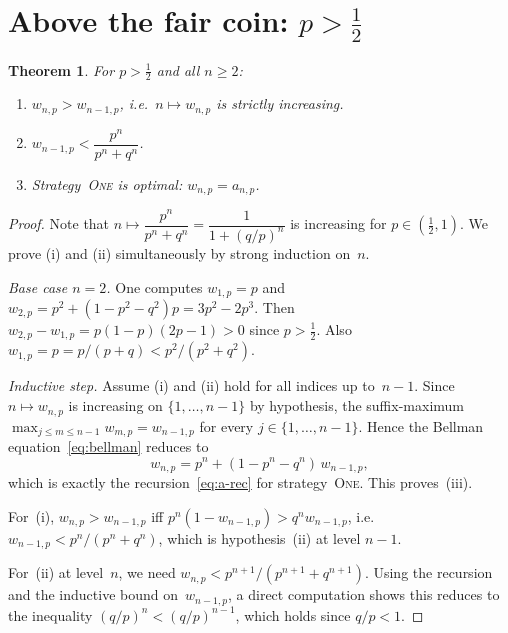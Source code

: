\documentclass[12pt]{article}
\newtheorem{theorem}{Theorem}[section]
\theoremstyle{definition}
\theoremstyle{remark}
\newcommand{\One}{\textsc{One}}
\begin{document}
\section{Above the fair coin: \texorpdfstring{$p>\tfrac12$}{p > 1/2}}
\label{sec:above}

\begin{theorem}\label{thm:above}
  For $p>\tfrac12$ and all $n\ge 2$:
  \begin{enumerate}[\rm(i)]
  \item $w_{n,p}>w_{n-1,p}$, i.e.\ $n\mapsto w_{n,p}$ is strictly
    increasing.
  \item $w_{n-1,p}<\dfrac{p^n}{p^n+q^n}$.
  \item Strategy~\One{} is optimal: $w_{n,p}=a_{n,p}$.
  \end{enumerate}
\end{theorem}

\begin{proof}
  Note that $n\mapsto \dfrac{p^n}{p^n+q^n} = \dfrac{1}{1+(q/p)^n}$ is increasing for $p \in (\tfrac 12, 1)$. 
  We prove (i) and (ii) simultaneously by strong induction on~$n$.

  \emph{Base case $n=2$.}
  One computes $w_{1,p}=p$ and
  $w_{2,p}=p^2+(1-p^2-q^2)p = 3p^2-2p^3$.  Then
  $w_{2,p}-w_{1,p}=p(1-p)(2p-1)>0$ since $p >\tfrac12$.
  Also $w_{1,p}=p = p/(p + q) < p^2/(p^2+q^2)$.

  \emph{Inductive step.}  Assume (i) and (ii) hold for all indices up
  to~$n-1$.  Since $n\mapsto w_{n,p}$ is increasing on
  $\{1,\dots,n-1\}$ by hypothesis, the suffix-maximum
  $\max_{j\le m\le n-1}w_{m,p}=w_{n-1,p}$ for every
  $j\in\{1,\dots,n-1\}$.  Hence the Bellman
  equation~\eqref{eq:bellman} reduces to
  \[
    w_{n,p} = p^n + (1-p^n-q^n)\,w_{n-1,p},
  \]
  which is exactly the recursion~\eqref{eq:a-rec} for
  strategy~\One.  This proves~(iii).

  For~(i), $w_{n,p}>w_{n-1,p}$ iff
  $p^n(1-w_{n-1,p})>q^n w_{n-1,p}$, i.e.\
  $w_{n-1,p}<p^n/(p^n+q^n)$, which is hypothesis~(ii) at level
  $n-1$.

  For~(ii) at level~$n$, we need $w_{n,p}<p^{n+1}/(p^{n+1}+q^{n+1})$.
  Using the recursion and the inductive bound on~$w_{n-1,p}$, a
  direct computation shows this reduces to the inequality
  $(q/p)^n<(q/p)^{n-1}$, which holds since $q/p<1$.
\end{proof}
\end{document}
